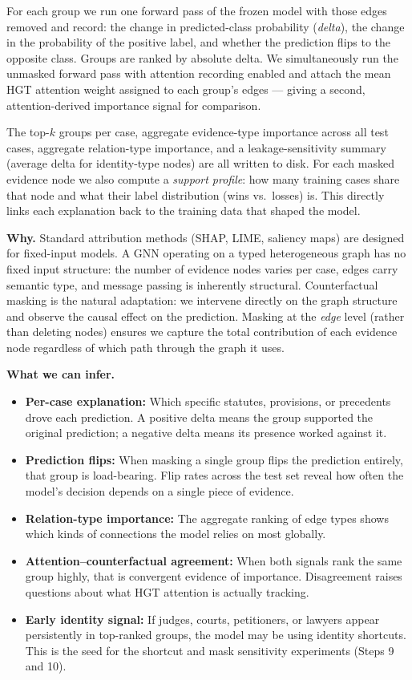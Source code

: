 \documentclass[11pt,a4paper]{article}
\begin{document}
For each group we run one forward pass of the frozen model with those edges removed
and record: the change in predicted-class probability (\emph{delta}), the change in
the probability of the positive label, and whether the prediction flips to the
opposite class. Groups are ranked by absolute delta. We simultaneously run the
unmasked forward pass with attention recording enabled and attach the mean HGT
attention weight assigned to each group's edges --- giving a second, attention-derived
importance signal for comparison.

The top-$k$ groups per case, aggregate evidence-type importance across all test cases,
aggregate relation-type importance, and a leakage-sensitivity summary (average delta
for identity-type nodes) are all written to disk. For each masked evidence node we
also compute a \emph{support profile}: how many training cases share that node and
what their label distribution (wins vs.\ losses) is. This directly links each
explanation back to the training data that shaped the model.

\textbf{Why.}
Standard attribution methods (SHAP, LIME, saliency maps) are designed for
fixed-input models. A GNN operating on a typed heterogeneous graph has no fixed
input structure: the number of evidence nodes varies per case, edges carry semantic
type, and message passing is inherently structural. Counterfactual masking is the
natural adaptation: we intervene directly on the graph structure and observe the
causal effect on the prediction. Masking at the \emph{edge} level (rather than
deleting nodes) ensures we capture the total contribution of each evidence node
regardless of which path through the graph it uses.

\textbf{What we can infer.}
\begin{itemize}
  \item \textbf{Per-case explanation:} Which specific statutes, provisions, or
    precedents drove each prediction. A positive delta means the group supported the
    original prediction; a negative delta means its presence worked against it.
  \item \textbf{Prediction flips:} When masking a single group flips the prediction
    entirely, that group is load-bearing. Flip rates across the test set reveal how
    often the model's decision depends on a single piece of evidence.
  \item \textbf{Relation-type importance:} The aggregate ranking of edge types shows
    which kinds of connections the model relies on most globally.
  \item \textbf{Attention--counterfactual agreement:} When both signals rank the same
    group highly, that is convergent evidence of importance. Disagreement raises
    questions about what HGT attention is actually tracking.
  \item \textbf{Early identity signal:} If judges, courts, petitioners, or lawyers
    appear persistently in top-ranked groups, the model may be using identity
    shortcuts. This is the seed for the shortcut and mask sensitivity experiments
    (Steps 9 and 10).
\end{itemize}
\end{document}
